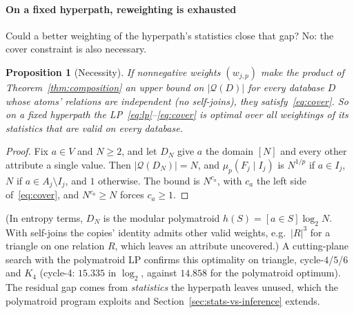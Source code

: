 \documentclass[conference]{IEEEtran}
\newcommand{\query}{\mathcal{Q}}
\newcommand{\block}{F}
\newcommand{\interface}{I}
\newcommand{\muLp}[3]{\mu_{#1}(#2 \mid #3)}
\newtheorem{proposition}[theorem]{Proposition}
\begin{document}
\paragraph{On a fixed hyperpath, reweighting is exhausted}
Could a better weighting of the hyperpath's statistics close that gap?
No: the cover constraint is also necessary.

\begin{proposition}[Necessity]
\label{prop:necessity}
If nonnegative weights $(w_{j,p})$ make the product of
Theorem~\ref{thm:composition} an upper bound on $|\query(D)|$ for every database $D$ whose atoms' relations are independent (no self-joins), they satisfy~\eqref{eq:cover}. So on a fixed hyperpath the
LP~\eqref{eq:lp}--\eqref{eq:cover} is optimal over all weightings of its
statistics that are valid on every database.
\end{proposition}

\begin{proof}
Fix $a\in V$ and $N\ge2$, and let $D_N$ give $a$ the domain $[N]$ and
every other attribute a single value. Then $|\query(D_N)|=N$, and
$\muLp{p}{\block_j}{\interface_j}$ is $N^{1/p}$ if $a\in\interface_j$, $N$
if $a\in A_j\setminus\interface_j$, and $1$ otherwise. The bound is
$N^{c_a}$, with $c_a$ the left side of~\eqref{eq:cover}, and
$N^{c_a}\ge N$ forces $c_a\ge1$.
\end{proof}

\noindent (In entropy terms, $D_N$ is the modular polymatroid $h(S)=[a\in S]\log_2N$. With self-joins the copies' identity admits other valid weights, e.g.\ $|R|^3$ for a triangle on one relation $R$, which leaves an attribute uncovered.) A cutting-plane search with the polymatroid LP
confirms this optimality on triangle, cycle-$4$/$5$/$6$ and $K_4$ (cycle-4: $15.335$
in $\log_2$, against $14.858$ for the polymatroid optimum). The residual
gap comes from \emph{statistics} the hyperpath leaves unused, which the
polymatroid program exploits and Section~\ref{sec:stats-vs-inference}
extends.
\end{document}
